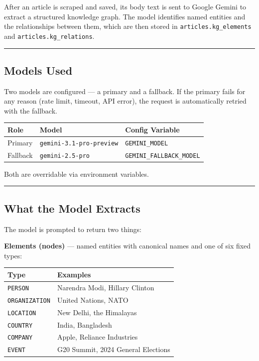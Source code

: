 \documentclass[
]{article}
\newcounter{none} %
\begin{document}
After an article is scraped and saved, its body text is sent to Google
Gemini to extract a structured knowledge graph. The model identifies
named entities and the relationships between them, which are then stored
in \texttt{articles.kg\_elements} and \texttt{articles.kg\_relations}.

\begin{center}\rule{0.5\linewidth}{0.5pt}\end{center}

\subsection{Models Used}\label{models-used}

Two models are configured --- a primary and a fallback. If the primary
fails for any reason (rate limit, timeout, API error), the request is
automatically retried with the fallback.

{\def\LTcaptype{none} %
\begin{longtable}[]{@{}lll@{}}
\toprule\noalign{}
Role & Model & Config Variable \\
\midrule\noalign{}
\endhead
\bottomrule\noalign{}
\endlastfoot
Primary & \texttt{gemini-3.1-pro-preview} & \texttt{GEMINI\_MODEL} \\
Fallback & \texttt{gemini-2.5-pro} & \texttt{GEMINI\_FALLBACK\_MODEL} \\
\end{longtable}
}

Both are overridable via environment variables.

\begin{center}\rule{0.5\linewidth}{0.5pt}\end{center}

\subsection{What the Model Extracts}\label{what-the-model-extracts}

The model is prompted to return two things:

\textbf{Elements (nodes)} --- named entities with canonical names and
one of six fixed types:

{\def\LTcaptype{none} %
\begin{longtable}[]{@{}ll@{}}
\toprule\noalign{}
Type & Examples \\
\midrule\noalign{}
\endhead
\bottomrule\noalign{}
\endlastfoot
\texttt{PERSON} & Narendra Modi, Hillary Clinton \\
\texttt{ORGANIZATION} & United Nations, NATO \\
\texttt{LOCATION} & New Delhi, the Himalayas \\
\texttt{COUNTRY} & India, Bangladesh \\
\texttt{COMPANY} & Apple, Reliance Industries \\
\texttt{EVENT} & G20 Summit, 2024 General Elections \\
\end{longtable}
}
\end{document}
